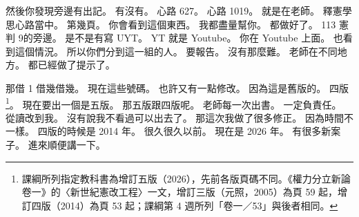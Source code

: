 \hypertarget{c01:cue:1671}{}然後你發現旁邊有出記。
\hypertarget{c01:cue:1672}{}有沒有。
\hypertarget{c01:cue:1673}{}心路 627。
\hypertarget{c01:cue:1674}{}心路 1019。
\hypertarget{c01:cue:1675}{}就是在老師。
\hypertarget{c01:cue:1676}{}釋憲學思心路當中。
\hypertarget{c01:cue:1677}{}第幾頁。
\hypertarget{c01:cue:1678}{}你會看到這個東西。
\hypertarget{c01:cue:1679}{}我都盡量幫你。
\hypertarget{c01:cue:1680}{}都做好了。
\hypertarget{c01:cue:1681}{}113 憲判 9的旁邊。
\hypertarget{c01:cue:1682}{}是不是有寫 UYT。
\hypertarget{c01:cue:1683}{}YT 就是 Youtube。
\hypertarget{c01:cue:1684}{}你在 Youtube 上面。
\hypertarget{c01:cue:1685}{}也看到這個情況。
\hypertarget{c01:cue:1686}{}所以你們分到這一組的人。
\hypertarget{c01:cue:1687}{}要報告。
\hypertarget{c01:cue:1688}{}沒有那麼難。
\hypertarget{c01:cue:1689}{}老師在不同地方。
\hypertarget{c01:cue:1690}{}都已經做了提示了。

\hypertarget{c01:cue:1691}{}那借 1 借幾借幾。
\hypertarget{c01:cue:1692}{}現在這些號碼。
\hypertarget{c01:cue:1693}{}也許又有一點修改。
\hypertarget{c01:cue:1694}{}因為這是舊版的。
\hypertarget{c01:cue:1695}{}四版\footnote{課綱所列指定教科書為增訂五版（2026），先前各版頁碼不同。《權力分立新論 卷一》的〈新世紀憲改工程〉一文，增訂三版（元照，2005）為頁 59 起，增訂四版（2014）為頁 53 起；課綱第 4 週所列「卷一／53」與後者相同。}。
\hypertarget{c01:cue:1696}{}現在要出一個是五版。
\hypertarget{c01:cue:1697}{}那五版跟四版呢。
\hypertarget{c01:cue:1698}{}老師每一次出書。
\hypertarget{c01:cue:1699}{}一定負責任。
\hypertarget{c01:cue:1700}{}從讀改到我。
\hypertarget{c01:cue:1701}{}沒有說我不看過可以出去了。
\hypertarget{c01:cue:1702}{}那這次我做了很多修正。
\hypertarget{c01:cue:1703}{}因為時間不一樣。
\hypertarget{c01:cue:1704}{}四版的時候是 2014 年。
\hypertarget{c01:cue:1705}{}很久很久以前。
\hypertarget{c01:cue:1706}{}現在是 2026 年。
\hypertarget{c01:cue:1707}{}有很多新案子。
\hypertarget{c01:cue:1708}{}進來順便講一下。

